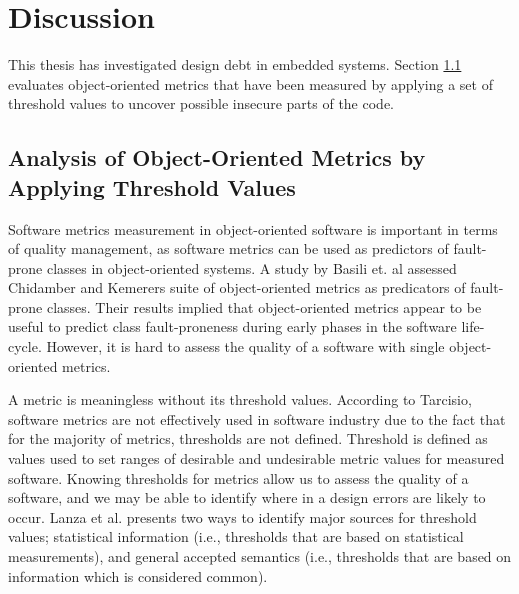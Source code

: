 
\chapter{Discussion}
This thesis has investigated design debt in embedded systems. Section \ref{sec:dis-analysis} evaluates object-oriented metrics that have been measured by applying a set of threshold values to uncover possible insecure parts of the code. 


\section{Analysis of Object-Oriented Metrics by Applying Threshold Values}
\label{sec:dis-analysis}
Software metrics measurement in object-oriented software is important in terms of quality management\cite{tarcisio,ferreira2012identifying}, as software metrics can be used as predictors of fault-prone classes in object-oriented systems\cite{basili1996validation}. A study by Basili et. al\cite{basili1996validation} assessed Chidamber and Kemerers\cite{chidamber1994metrics} suite of object-oriented metrics as predicators of fault-prone classes. Their results implied that object-oriented metrics appear to be useful to predict class fault-proneness during early phases in the software life-cycle. However, it is hard to assess the quality of a software with single object-oriented metrics. 

A metric is meaningless without its threshold values. According to Tarcisio\cite{tarcisio}, software metrics are not effectively used in software industry due to the fact that for the majority of metrics, thresholds are not defined. Threshold is defined as values used to set ranges of desirable and undesirable metric values for measured software\cite{ferreira2012identifying}. Knowing thresholds for metrics allow us to assess the quality of a software, and we may be able to identify where in a design errors are likely to occur. Lanza et al.\cite{lanza2007object} presents two ways to identify major sources for threshold values; statistical information (i.e., thresholds that are based on statistical measurements), and general accepted semantics (i.e., thresholds that are based on information which is considered common).  

